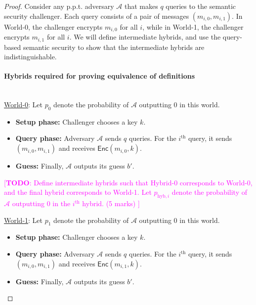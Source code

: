\documentclass[10pt,addpoints]{exam}
\newcommand{\calA}{\mathcal{A}}
\newcommand{\thh}{^{\mathrm{th}}}
\newcommand{\enc}{\mathsf{Enc}}
\newcommand{\TODO}[1]{\textcolor{magenta}{[\textbf{TODO}: #1]}}
\newcommand{\phybb}[1]{p_{\mathrm{hyb}, #1}}
\theoremstyle{definition}
\begin{document}
        \begin{proof}

            Consider any p.p.t. adversary $\calA$ that makes $q$ queries to the semantic security challenger. Each query consists of a pair of messages $(m_{i,0}, m_{i,1})$. In World-0, the challenger encrypts $m_{i,0}$ for all $i$, while in World-1, the challenger encrypts $m_{i,1}$ for all $i$. We will define intermediate hybrids, and use the query-based semantic security to show that the intermediate hybrids are indistinguishable. 

            \paragraph{Hybrids required for proving equivalence of definitions\\ \\}

            \underline{World-0}: Let $p_0$ denote the probability of $\calA$ outputting $0$ in this world. 

            \begin{itemize}[noitemsep]
                \item \textbf{Setup phase:} Challenger chooses a key $k$.
                \item \textbf{Query phase:} Adversary $\calA$ sends $q$ queries. For the $i\thh$ query, it sends $(m_{i,0}, m_{i,1})$ and receives $\enc(m_{i,0}, k)$.
                \item \textbf{Guess:} Finally, $\calA$ outputs its guess $b'$.
            \end{itemize}

            \vspace{10pt}

            \TODO{Define intermediate hybrids such that Hybrid-0 corresponds to World-0, and the final hybrid corresponds to World-1. Let $\phybb{i}$ denote the probability of $\calA$ outputting $0$ in the $i\thh$ hybrid. (5 marks) }

            \vspace{10pt}

            \underline{World-1}: Let $p_1$ denote the probability of $\calA$ outputting $0$ in this world. 

            \begin{itemize}[noitemsep]
                \item \textbf{Setup phase:} Challenger chooses a key $k$.
                \item \textbf{Query phase:} Adversary $\calA$ sends $q$ queries. For the $i\thh$ query, it sends $(m_{i,0}, m_{i,1})$ and receives {$\enc(m_{i,1}, k)$}.
                \item \textbf{Guess:} Finally, $\calA$ outputs its guess $b'$.
            \end{itemize}


\end{proof}
\end{document}
